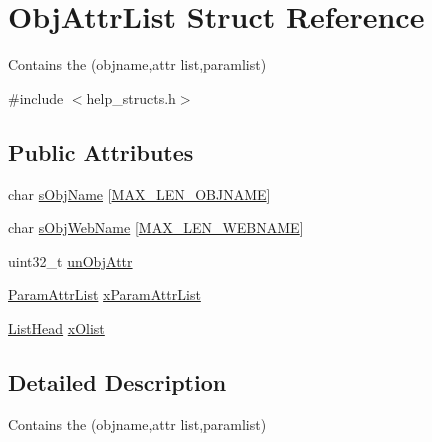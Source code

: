 \hypertarget{structObjAttrList}{\section{Obj\-Attr\-List Struct Reference}
\label{structObjAttrList}
}


Contains the (objname,attr list,paramlist)  




{\ttfamily \#include $<$help\-\_\-structs.\-h$>$}

\subsection*{Public Attributes}
\begin{DoxyCompactItemize}
\item 
char \hyperlink{structObjAttrList_af9bfa58adec27663f9c06da24304fd49}{s\-Obj\-Name} \mbox{[}\hyperlink{group__LIBHELP_ga635a84c0e3ae6e922f824064a006500d}{M\-A\-X\-\_\-\-L\-E\-N\-\_\-\-O\-B\-J\-N\-A\-M\-E}\mbox{]}
\item 
char \hyperlink{structObjAttrList_af1cd26ab3f2b8c069dd248f1afff6ba9}{s\-Obj\-Web\-Name} \mbox{[}\hyperlink{group__LIBHELP_gad283ffd6255aeb7b05ce1ed512a81102}{M\-A\-X\-\_\-\-L\-E\-N\-\_\-\-W\-E\-B\-N\-A\-M\-E}\mbox{]}
\item 
uint32\-\_\-t \hyperlink{structObjAttrList_a2cbeec81b9de69d1f22715be64840a56}{un\-Obj\-Attr}
\item 
\hyperlink{structParamAttrList}{Param\-Attr\-List} \hyperlink{structObjAttrList_a5178ea2319b79b81dfe12b57625e1996}{x\-Param\-Attr\-List}
\item 
\hyperlink{group__LIBHELP_ga73f73d414f252ff46652f16495641187}{List\-Head} \hyperlink{structObjAttrList_ae251d2a8abb6aefd017e82d986a65e8b}{x\-Olist}
\end{DoxyCompactItemize}


\subsection{Detailed Description}
Contains the (objname,attr list,paramlist) 

